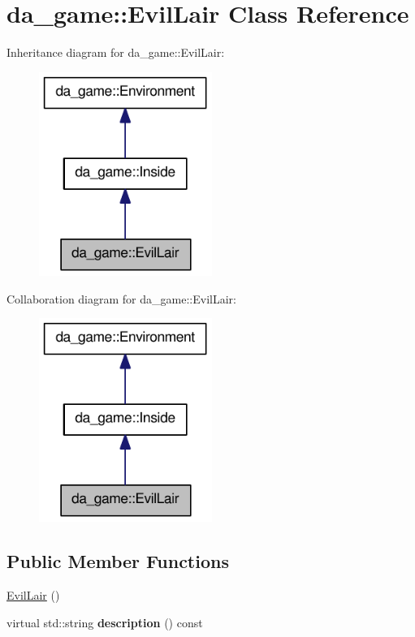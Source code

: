 \hypertarget{classda__game_1_1EvilLair}{
\section{da\_\-game::EvilLair Class Reference}
\label{classda__game_1_1EvilLair}
}
Inheritance diagram for da\_\-game::EvilLair:\nopagebreak
\begin{figure}[H]
\begin{center}
\leavevmode
\includegraphics[width=160pt]{classda__game_1_1EvilLair__inherit__graph}
\end{center}
\end{figure}
Collaboration diagram for da\_\-game::EvilLair:\nopagebreak
\begin{figure}[H]
\begin{center}
\leavevmode
\includegraphics[width=160pt]{classda__game_1_1EvilLair__coll__graph}
\end{center}
\end{figure}
\subsection*{Public Member Functions}
\begin{DoxyCompactItemize}
\item 
\hyperlink{classda__game_1_1EvilLair_afe4fe8ac046b4c91ad4e0a0fd4ba7baf}{EvilLair} ()
\item 
\hypertarget{classda__game_1_1EvilLair_adb5a496c651f24ed91e8fdf51c821787}{
virtual std::string {\bfseries description} () const }
\label{classda__game_1_1EvilLair_adb5a496c651f24ed91e8fdf51c821787}

\end{DoxyCompactItemize}


